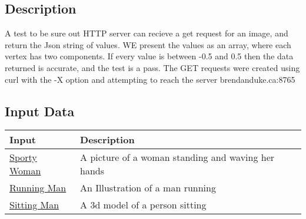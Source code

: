 \documentclass{scrreprt}
\begin{document}
\subsection{Description}

A test to be sure out HTTP server can recieve a get request for an image, and return the Json string of values. WE present the values as an array, where each vertex has two components. If every value is between -0.5 and 0.5 then the data returned is accurate, and the test is a pass. The GET requests were created using curl with the -X option and attempting to reach the server brendanduke.ca:8765
\subsection{Input Data}

\begin{table}[H]
        \centering
        \begin{tabular}{p{3cm}p{6cm}}
                \hline\hline
                Input & Description\\
                \hline\hline
                \href {http://st2.depositphotos.com/1912333/10089/i/950/depositphotos_100892946-stock-photo-sporty-woman-waving-hands.jpg}{Sporty Woman} &  A picture of a woman standing and waving her hands\\
                \hline
                \href {https://www.drawingnow.com/file/videos/image/how-to-draw-a-running-person.jpg}{Running Man} & An Illustration of a man running\\
                \hline
                \href {https://www.formfonts.com/files/1/13470/four-low-poly-models-people-sitting-different-poses_FF_Model_ID13470_1_LPMAD_20_00.jpg}{Sitting Man} & A 3d model of a person sitting\\
                \hline
        \end{tabular}
\end{table}
\end{document}
